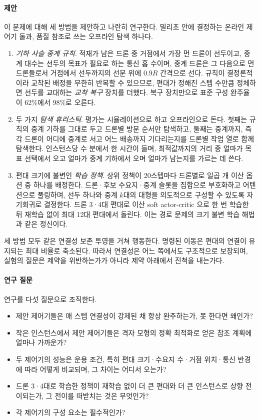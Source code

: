 \documentclass[final,5p,times,twocolumn]{elsarticle}
\begin{document}
\paragraph{제안}
이 문제에 대해 세 방법을 제안하고 나란히 연구한다. 밀리초 안에 결정하는 온라인 제어기 둘과, 품질
참조로 쓰는 오프라인 탐색 하나다.
\begin{enumerate}
\item \emph{기하 사슬 중계 규칙}. 적재가 남은 드론 중 거점에서 가장 먼 드론이 선두이고,
중계 대수는 선두의 목표가 필요로 하는 통신 홉 수이며, 중계 드론은 그 다음으로 먼 드론들로서 거점에서
선두까지의 선분 위에 $0.9R$ 간격으로 선다. 규칙이 결정론적이라 교착된 배정을 무한히 반복할 수
있으므로, 편대가 정해진 스텝 수만큼 정체하면 선두를 교대하는 \emph{교착 복구} 장치를 더했다. 복구
장치만으로 표준 구성 완주율이 62\%에서 98\%로 오른다.
\item 두 가지 \emph{탐색 휴리스틱}. 평가는 시뮬레이션으로 하고 오프라인으로 돈다. 첫째는 규칙의
중계 기하를 그대로 두고 드론별 방문 순서만 탐색하고, 둘째는 중계까지, 즉 각 드론이 어디에 중계로
서고 어느 배송까지 기다리는지를 드론별 작업 열로 함께 탐색한다. 인스턴스당 수 분에서 한 시간이
들며, 최적값까지의 거리 중 얼마가 목표 선택에서 오고 얼마가 중계 기하에서 오며 얼마가 남는지를
가르는 데 쓴다.
\item 편대 크기에 불변인 \emph{학습 정책}. 상위 정책이 20스텝마다 드론별로 일곱 개 이산 옵션
중 하나를 배정한다. 드론·후보 수요지·중계 슬롯을 집합으로 부호화하고 어텐션으로 풀링하며,
선두 하나와 중계 $k$대의 대형을 의도적으로 구성할 수 있도록 자기회귀로 결정한다. 드론 3·4대 편대로
이산 soft actor-critic \cite{haarnoja2018}으로 한 번 학습한 뒤 재학습 없이 최대 12대 편대에서
돌린다. 이는 경로 문제의 크기 불변 학습 해법 \cite{kool2019,park2023}과 같은 정신이다.
\end{enumerate}
세 방법 모두 같은 연결성 보존 투영을 거쳐 행동한다. 명령된 이동은 편대의 연결이 유지되는 최대
비율로 축소된다. 따라서 연결성은 어느 쪽에서도 구조적으로 보장되며, 실험의 질문은 제약을
위반하는가가 아니라 제약 아래에서 진척을 내는가다.

\paragraph{연구 질문}
연구를 다섯 질문으로 조직한다.
\begin{itemize}
\item[\textbf{RQ1}] 제안 제어기들은 매 스텝 연결성이 강제된 채 항상 완주하는가, 못 한다면 왜인가?
\item[\textbf{RQ2}] 작은 인스턴스에서 제안 제어기들은 격자 모형의 정확 최적화로 얻은 참조 계획에
얼마나 가까운가?
\item[\textbf{RQ3}] 두 제어기의 성능은 운용 조건, 특히 편대 크기·수요지 수·거점 위치·통신 반경에
따라 어떻게 비교되며, 그 차이는 어디서 오는가?
\item[\textbf{RQ4}] 드론 3·4대로 학습한 정책이 재학습 없이 더 큰 편대와 더 큰 인스턴스로 상향
전이되는가, 그 전이를 떠받치는 것은 무엇인가?
\item[\textbf{RQ5}] 각 제어기의 구성 요소는 필수적인가?
\end{itemize}
\end{document}
